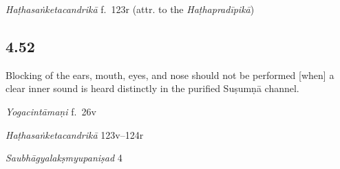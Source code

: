 \begin{ekdosis}
\begin{testimonia}[hp04_051]
\emph{Haṭhasaṅketacandrikā} f.~123r (attr. to the \emph{Haṭhapradīpikā})
\begin{versinnote}
\end{versinnote}
\end{testimonia}


\subsection*{4.52}
\begin{translation}[hp04_052]
Blocking of the ears, mouth, eyes, and nose should not be performed [when] a clear inner sound is heard distinctly in the purified Suṣumṇā channel.
\end{translation}


\begin{testimonia}[hp04_052]
\emph{Yogacintāmaṇi} f.~26v
\begin{versinnote}
\end{versinnote}

\emph{Haṭhasaṅketacandrikā} 123v–124r
\begin{versinnote}
\end{versinnote}

\emph{Saubhāgyalakṣmyupaniṣad} 4
\begin{versinnote}
\end{versinnote}
\end{testimonia}


\end{ekdosis}
